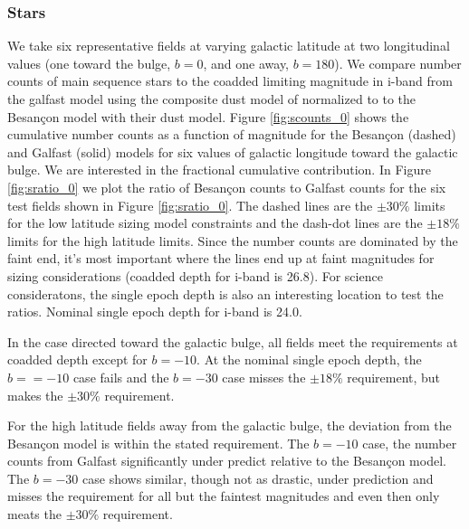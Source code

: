 \documentclass[]{article}
\begin{document}
\subsubsection{Stars}
We take six representative fields at varying galactic latitude at two longitudinal values (one toward the bulge, $b=0$, and one away, $b=180$).  
We compare number 
counts of main sequence stars to the coadded limiting magnitude in i-band 
 from the galfast model using the composite dust model
of \cite{amores05} normalized to \cite{schlegel98} to the Besan\c{c}on \cite{besancon} model with their dust model.  Figure \ref{fig:scounts_0} shows 
the cumulative number counts as a function of magnitude for the Besan\c{c}on (dashed) and Galfast (solid) models 
for six values of galactic longitude toward the galactic bulge.  We are interested in the
fractional cumulative contribution.  In Figure \ref{fig:sratio_0} we plot the ratio of Besan\c{c}on counts to Galfast counts for the six test fields shown in Figure \ref{fig:sratio_0}.
The dashed lines are the $\pm30\%$ limits for the low latitude sizing model constraints and the dash-dot lines are the $\pm18\%$ limits for the high latitude limits.
Since the number counts are dominated by the faint end, it's most important where the lines end up at faint magnitudes for sizing considerations (coadded depth for i-band is 26.8).  For science consideratons, the single epoch depth is also an interesting location to test the ratios.  Nominal single epoch depth for i-band is 24.0.  

In the case directed toward the galactic bulge, all fields meet the requirements at coadded depth except
for $b=-10$.  At the nominal single epoch depth, the $b==-10$ case fails and the $b=-30$ case misses the $\pm18\%$
requirement, but makes the $\pm30\%$ requirement.

For the high latitude fields away from the galactic bulge, the deviation from the Besan\c{c}on model is within 
the stated requirement.  The $b=-10$ case, the number counts from Galfast significantly under predict relative to 
the Besan\c{c}on model.  The $b=-30$ case shows similar, though not as drastic, under prediction and misses the 
requirement for all but the faintest magnitudes and even then only meats the $\pm30\%$ requirement.
\end{document}

